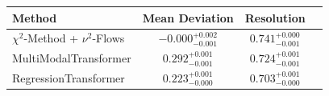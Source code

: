     \begin{tabular}{lccc}
        \toprule
        Method & Mean Deviation & Resolution \\
        \midrule
        $\chi^2$-Method + $\nu^2$-Flows & $-0.000_{-0.001}^{+0.002}$ & $0.741_{-0.001}^{+0.000}$ \\
        MultiModalTransformer & $0.292_{-0.001}^{+0.001}$ & $0.724_{-0.001}^{+0.001}$ \\
        RegressionTransformer & $0.223_{-0.000}^{+0.001}$ & $0.703_{-0.000}^{+0.001}$ \\
        \bottomrule
    \end{tabular}